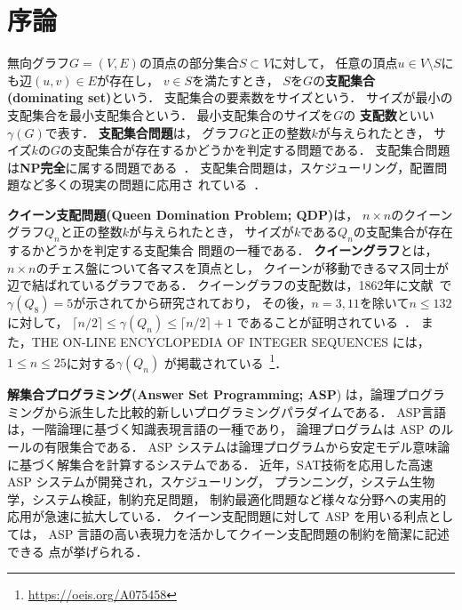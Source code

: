\chapter{序論}\label{chap:introduction}

無向グラフ$G=(V,E)$の頂点の部分集合$S\subset V$に対して，
任意の頂点$u \in V\setminus S$にも辺$(u,v) \in E$が存在し，
$v \in S$を満たすとき，
$S$を$G$の\textbf{支配集合 (dominating set)}という．
支配集合の要素数をサイズという．
サイズが最小の支配集合を最小支配集合という．
最小支配集合のサイズを$G$の
\textbf{支配数}といい$\gamma(G)$で表す．
% 
\textbf{支配集合問題}は，
グラフ$G$と正の整数$k$が与えられたとき，
サイズ$k$の$G$の支配集合が存在するかどうかを判定する問題である．
支配集合問題は\textbf{NP完全}に属する問題である~\cite{Jhonson79}．
支配集合問題は，スケジューリング，配置問題など多くの現実の問題に応用さ
れている~\cite{Haynes98,Haynes98Advanced}．

\textbf{クイーン支配問題(Queen Domination Problem; QDP)}は，
$n \times n$のクイーングラフ$Q_{n}$と正の整数$k$が与えられたとき，
サイズが$k$である$Q_{n}$の支配集合が存在するかどうかを判定する支配集合
問題の一種である．
\textbf{クイーングラフ}とは，
$n\times n$のチェス盤について各マスを頂点とし，
クイーンが移動できるマス同士が辺で結ばれているグラフである．
クイーングラフの支配数は，1862年に文献~\cite{Jaenisch62}で
$\gamma(Q_8)=5$が示されてから研究されており，
その後，$n=3,11$を除いて$n \leq 132$に対して，
$\lceil n/2 \rceil \leq \gamma(Q_n) \leq \lceil n/2 \rceil +1$
であることが証明されている~\cite{Ostergard01}．
また，THE ON-LINE ENCYCLOPEDIA OF INTEGER SEQUENCES には，
$1\leq n\leq 25$に対する$\gamma(Q_n)$
が掲載されている~\footnote{\url{https://oeis.org/A075458}}．

\textbf{解集合プログラミング(Answer Set Programming; ASP}\cite{%
  Baral03:cambridge,%
  Gelfond88:iclp,%
  Inoue08:jssst,%
  Niemela99:amai})
は，論理プログラミングから派生した比較的新しいプログラミングパラダイムである．
ASP言語は，一階論理に基づく知識表現言語の一種であり，
論理プログラムは ASP のルールの有限集合である．
ASP システムは論理プログラムから安定モデル意味論に基づく解集合を計算するシステムである．
近年，SAT技術を応用した高速 ASP システムが開発され，スケジューリング，
プランニング，システム生物学，システム検証，制約充足問題，
制約最適化問題など様々な分野への実用的応用が急速に拡大している．
クイーン支配問題に対して ASP を用いる利点としては，
ASP 言語の高い表現力を活かしてクイーン支配問題の制約を簡潔に記述できる
点が挙げられる．

